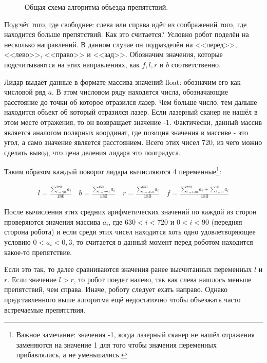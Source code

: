 \begin{figure}[ht]
  \caption{Общая схема алгоритма объезда препятствий.}\label{fig:algorithm-obstacle}
\end{figure}

Подсчёт того, где свободнее: слева или справа идёт из соображений того, где находится больше препятствий. Как это считается? Условно робот поделён на несколько направлений. В данном случае он подразделён на <<перед>>, <<лево>>, <<право>> и <<зад>>. Обозначим значения, которые подсчитываются на этих направлениях, как $f, l, r$ и $b$ соответственно. 

Лидар выдаёт данные в формате массива значений float: обозначим его как числовой ряд $a$. В этом числовом ряду находятся числа, обозначающие расстояние до точки об которое отразился лазер. Чем больше число, тем дальше находится объект об который отразился лазер. Если лазерный сканер не нашёл в этом месте отражения, то он возвращает значение -1. Фактически, данный массив является аналогом полярных координат, где позиция значения в массиве - это угол, а само значение является расстоянием. Всего этих чисел 720, из чего можно сделать вывод, что цена деления лидара это полградуса. 

Таким образом каждый поворот лидара вычисляются 4 переменные\footnote{Важное замечание: значения -1, когда лазерный сканер не нашёл отражения заменяются на значение 1 для того чтобы значения переменных прибавлялись, а не уменьшались.}:

\[
\begin{array}{c}
l = \frac{\displaystyle\sum_{i=90}^{270} a_i}{180} \quad
b = \frac{\displaystyle\sum_{i=270}^{450} a_i}{180}\quad
r = \frac{\displaystyle\sum_{i=450}^{630} a_i}{180} \quad
f = \frac{\displaystyle\sum_{i=630}^{720} a_i + \sum_{i=0}^{90} a_i}{180}
\end{array}
\]

После вычисления этих средних арифметических значений по каждой из сторон проверяются значения массива $a_i$, где $630 < i < 720$ и $0 < i < 90$ (передняя сторона робота) и если среди этих чисел находится хоть одно удовлетворяющее условию $0 < a_i < 0,3$, то считается в данный момент перед роботом находится какое-то препятствие.

Если это так, то далее сравниваются значения ранее высчитанных переменных $l$ и $r$. Если значение $l > r$, то робот поедет налево, так как слева нашлось меньше препятствий, чем справа. Иначе, роботу следует ехать направо. Однако представленного выше алгоритма ещё недостаточно чтобы объезжать часто встречаемые препятствия. 


